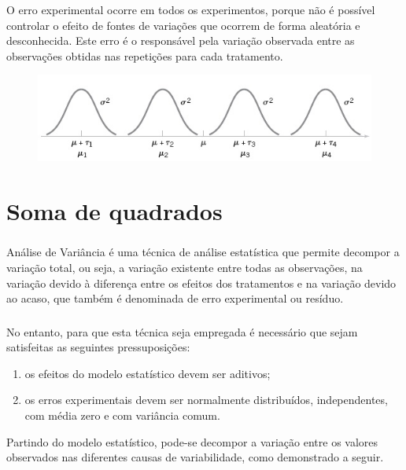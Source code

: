 \documentclass[14pt,aspectratio=1610]{beamer}
\begin{document}
\begin{frame}{}
\frametitle{}
\begin{block}{}
\justifying
O erro experimental ocorre em todos os experimentos, porque não é possível controlar o efeito de fontes de variações que ocorrem de forma aleatória e desconhecida. Este erro é o responsável pela variação observada entre as observações obtidas nas repetições para cada tratamento.

\begin{figure}[H]
    \centering
    \includegraphics[scale=0.5]{Figuras/fig2}
  \end{figure}

\end{block}
\end{frame}

\section{Soma de quadrados}
\begin{frame}{}
\frametitle{}
\begin{block}{}
\justifying
Análise de Variância é uma técnica de análise estatística que permite decompor a variação total, ou seja, a variação existente entre todas as observações, na variação devido à diferença entre os efeitos dos tratamentos e na variação devido ao acaso, que também é denominada de erro experimental ou resíduo.
\end{block}
\end{frame}

\begin{frame}{}
\frametitle{}
\begin{block}{}
\justifying
No entanto, para que esta técnica seja empregada é necessário que sejam
satisfeitas as seguintes pressuposições:
\begin{enumerate}
\item os efeitos do modelo estatístico devem ser aditivos;\pause
\item os erros experimentais devem ser normalmente distribuídos, independentes, com
média zero e com variância comum.
\end{enumerate}
Partindo do modelo estatístico, pode-se decompor a variação entre os valores
observados nas diferentes causas de variabilidade, como demonstrado a seguir.
\end{block}
\end{frame}
\end{document}
